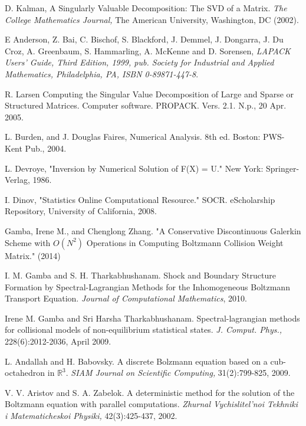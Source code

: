 \documentclass[12pt]{CSUNthesis}
\def\R{\mathbb{R}}
\begin{document}
\begin{footnotesize}
\begin{thebibliography}{100}

 D. Kalman, A Singularly Valuable Decomposition: The SVD of a Matrix. \textit{The College Mathematics Journal,} The American University, Washington, DC (2002).

 E Anderson, Z. Bai, C. Bischof, S. Blackford, J. Demmel, J. Dongarra, J. Du Croz, A. Greenbaum, S. Hammarling, A. McKenne and D. Sorensen, \textit{LAPACK Users' Guide, Third Edition, 1999, pub. Society for Industrial and Applied Mathematics, Philadelphia, PA, ISBN 0-89871-447-8}.

 R. Larsen Computing the Singular Value Decomposition of Large and Sparse or Structured Matrices. Computer software. PROPACK. Vers. 2.1. N.p., 20 Apr. 2005.

 L. Burden, and J. Douglas Faires, Numerical Analysis. 8th ed. Boston: PWS-Kent Pub., 2004.

 L. Devroye, "Inversion by Numerical Solution of F(X) = U." New York: Springer-Verlag, 1986.

 I. Dinov, "Statistics Online Computational Resource." SOCR. eScholarship Repository, University of California, 2008.

 Gamba, Irene M., and Chenglong Zhang. "A Conservative Discontinuous Galerkin Scheme with $O(N^2)$ Operations in Computing Boltzmann Collision Weight Matrix." (2014)

 I. M. Gamba and S. H. Tharkabhushanam. Shock and Boundary Structure Formation by Spectral-Lagrangian Methods for the Inhomogeneous Boltzmann Transport Equation. \textit{Journal of Computational Mathematics}, 2010.

 Irene M. Gamba and Sri Harsha Tharkabhushanam. Spectral-lagrangian methods for collisional models of non-equilibrium statistical states. \textit{J. Comput. Phys.,} 228(6):2012-2036, April 2009.


 L. Andallah and H. Babovsky. A discrete Bolzmann equation based on a cub-octahedron in $\R^3$. \textit{SIAM Journal on Scientific Computing,} 31(2):799-825, 2009.

 V. V. Aristov and S. A. Zabelok. A deterministic method for the solution of the Boltzmann equation with parallel computations. \textit{Zhurnal Vychislitel'noi Tekhniki i Matematicheskoi Physiki,} 42(3):425-437, 2002.


\end{thebibliography}
\end{footnotesize}
\end{document}
